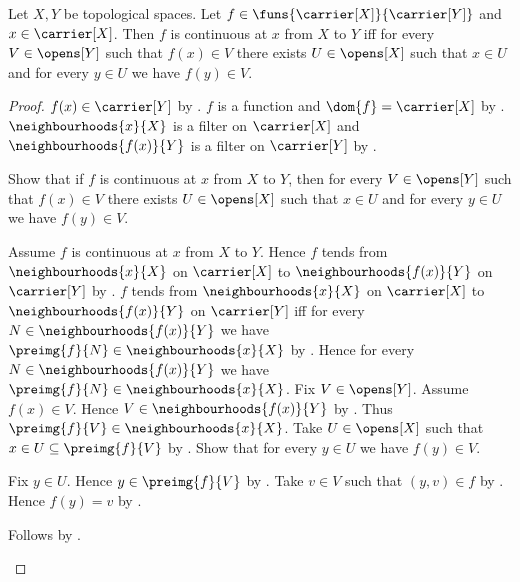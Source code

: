 \begin{theorem}\label{continuous_at_iff_open_local}
    Let $X,Y$ be topological spaces.
    Let $f\in\funs{\carrier[X]}{\carrier[Y]}$ and
        $x\in\carrier[X]$.
    Then $f$ is continuous at $x$ from $X$ to $Y$ iff
        for every $V\in\opens[Y]$ such that $f(x)\in V$ there exists
        $U\in\opens[X]$ such that $x\in U$ and
        for every $y\in U$ we have $f(y)\in V$.
\end{theorem}
\begin{proof}
    $f(x)\in\carrier[Y]$ by .
    $f$ is a function and $\dom{f}=\carrier[X]$ by
        .
    $\neighbourhoods{x}{X}$ is a filter on $\carrier[X]$ and
        $\neighbourhoods{f(x)}{Y}$ is a filter on $\carrier[Y]$ by
        .

    Show that if $f$ is continuous at $x$ from $X$ to $Y$, then
        for every $V\in\opens[Y]$ such that $f(x)\in V$ there exists
        $U\in\opens[X]$ such that $x\in U$ and
        for every $y\in U$ we have $f(y)\in V$.
    \begin{subproof}
        Assume $f$ is continuous at $x$ from $X$ to $Y$.
        Hence $f$ tends from $\neighbourhoods{x}{X}$ on $\carrier[X]$ to
            $\neighbourhoods{f(x)}{Y}$ on $\carrier[Y]$ by
            .
        $f$ tends from $\neighbourhoods{x}{X}$ on $\carrier[X]$ to
            $\neighbourhoods{f(x)}{Y}$ on $\carrier[Y]$ iff
            for every $N\in\neighbourhoods{f(x)}{Y}$ we have
            $\preimg{f}{N}\in\neighbourhoods{x}{X}$ by
            .
        Hence for every $N\in\neighbourhoods{f(x)}{Y}$ we have
            $\preimg{f}{N}\in\neighbourhoods{x}{X}$.
        Fix $V\in\opens[Y]$.
        Assume $f(x)\in V$.
        Hence $V\in\neighbourhoods{f(x)}{Y}$ by
            .
        Thus $\preimg{f}{V}\in\neighbourhoods{x}{X}$.
        Take $U\in\opens[X]$ such that
            $x\in U\subseteq\preimg{f}{V}$ by
            .
        Show that for every $y\in U$ we have $f(y)\in V$.
        \begin{subproof}
            Fix $y\in U$.
            Hence $y\in\preimg{f}{V}$ by .
            Take $v\in V$ such that $(y,v)\in f$ by .
            Hence $f(y)=v$ by .
        \end{subproof}
        Follows by \auto.
    \end{subproof}


\end{proof}
